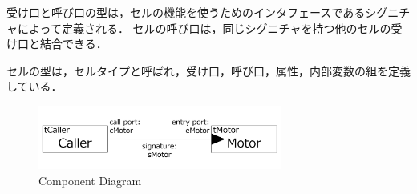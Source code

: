 \documentclass[submit]{ipsj_v2/UTF8/ipsj}
\begin{document}
受け口と呼び口の型は，セルの機能を使うためのインタフェースであるシグニチャによって定義される．
セルの呼び口は，同じシグニチャを持つ他のセルの受け口と結合できる．

セルの型は，セルタイプと呼ばれ，受け口，呼び口，属性，内部変数の組を定義している．

\begin{figure}[t]
    \centering
    \includegraphics[width=8cm,clip]{../EMSOFT2016/figure/component_diagram.pdf}
    \caption{Component Diagram}
    \label{fig:component}
\end{figure}
\end{document}
